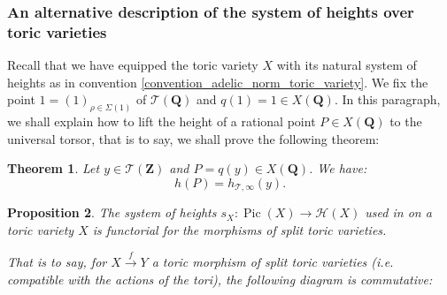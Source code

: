 \documentclass{proc-l}
\newcommand{\Z}{\mathbf{Z}}
\newcommand{\Q}{\mathbf{Q}}
\DeclareMathOperator{\Pic}{Pic}
\newcommand{\stackT}{\mathcal{T}}
\newtheorem{theorem}{Theorem}[section]
\newtheorem{prop}[theorem]{Proposition}
\theoremstyle{definition}
\theoremstyle{remark}
\numberwithin{equation}{section}
\begin{document}
\subsubsection{An alternative description of the system of heights over toric varieties}

Recall that we have equipped the toric variety $X$ with its natural system of heights as in convention \ref{convention_adelic_norm_toric_variety}. We fix the point $1 = (1)_{\rho \in \Sigma(1)}$ of $\stackT(\Q)$ and $q(1) = 1 \in X(\Q)  $. In this paragraph, we shall explain how to lift the height of a rational point $P \in X(\Q)$ to the universal torsor, that is to say, we shall prove the following theorem:

\begin{theorem}\label{simplification_of_the_height_to_univ_torsor}
    Let $y \in \stackT(\Z)$ and $P = q(y) \in X(\Q)$. We have:
    $$ h(P) = h_{\stackT,\infty}(y) .$$
\end{theorem}



\begin{prop}\label{fonctorialite_systeme_hauteur}
   The system of heights $s_X : \Pic(X) \rightarrow \mathcal{H}(X)$ used in \cite{salberger_torsor} on a toric variety $X$ is functorial for the morphisms of split toric varieties.

    That is to say, for $X \xrightarrow{f} Y$ a toric morphism of split toric varieties (i.e. compatible with the actions of the tori), the following diagram is commutative:
    \begin{center}
\end{center}

\end{prop}
\end{document}
